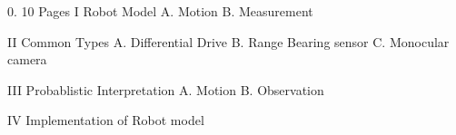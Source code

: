 0. 10 Pages
I Robot Model
    A. Motion
    B. Measurement

II  Common Types
    A. Differential Drive
    B. Range Bearing sensor
    C. Monocular camera

III Probablistic Interpretation
    A. Motion
    B. Observation

IV  Implementation of Robot model
